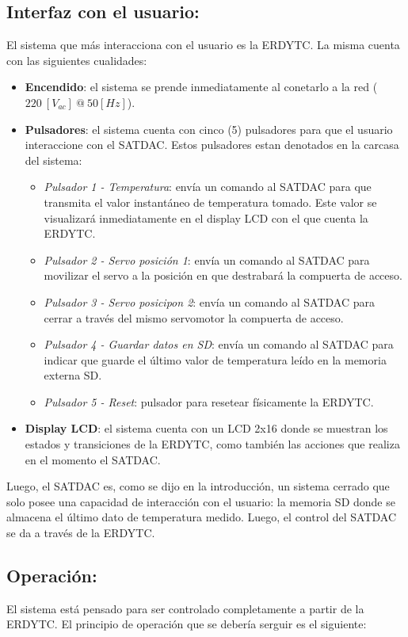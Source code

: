 \documentclass[conference]{IEEEtran}
\begin{document}
\subsection{Interfaz con el usuario:}
\label{sec:orgb8d36f3}
El sistema que más interacciona con el usuario es la ERDYTC. La misma cuenta con las siguientes cualidades:

\begin{itemize}
\item \textbf{Encendido}: el sistema se prende inmediatamente al conetarlo a la red (\(220 \: [V_{ac}] \: @ \: 50 [Hz]\)).
\item \textbf{Pulsadores}: el sistema cuenta con cinco (5) pulsadores para que el usuario interaccione con el SATDAC. Estos pulsadores estan denotados en la carcasa del sistema:
\begin{itemize}
\item \emph{Pulsador 1 - Temperatura}: envía un comando al SATDAC para que transmita el valor instantáneo de temperatura tomado. Este valor se visualizará inmediatamente en el display LCD con el que cuenta la ERDYTC.
\item \emph{Pulsador 2 - Servo posición 1}: envía un comando al SATDAC para movilizar el servo a la posición en que destrabará la compuerta de acceso.
\item \emph{Pulsador 3 - Servo posicipon 2}: envía un comando al SATDAC para cerrar a través del mismo servomotor la compuerta de acceso.
\item \emph{Pulsador 4 - Guardar datos en SD}: envía un comando al SATDAC para indicar que guarde el último valor de temperatura leído en la memoria externa SD.
\item \emph{Pulsador 5 - Reset}: pulsador para resetear físicamente la ERDYTC.
\end{itemize}
\item \textbf{Display LCD}: el sistema cuenta con un LCD 2x16 donde se muestran los estados y transiciones de la ERDYTC, como también las acciones que realiza en el momento el SATDAC.
\end{itemize}

Luego, el SATDAC es, como se dijo en la introducción, un sistema cerrado que solo posee una capacidad de interacción con el usuario: la memoria SD donde se almacena el último dato de temperatura medido. Luego, el control del SATDAC se da a través de la ERDYTC.

\subsection{Operación:}
\label{sec:orgdc0b746}
El sistema está pensado para ser controlado completamente a partir de la ERDYTC. El principio de operación que se debería serguir es el siguiente:
\end{document}
